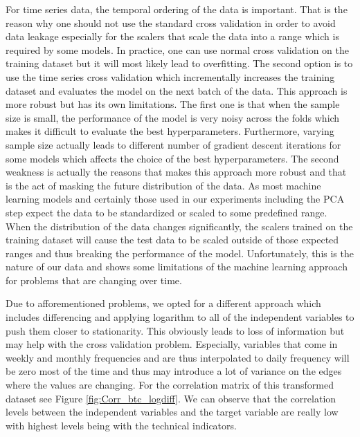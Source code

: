 For time series data, the temporal ordering of the data is important.
That is the reason why one should not use the standard cross validation
in order to avoid data leakage especially 
for the scalers that scale the data into a range
which is required by some models. In practice, 
one can use normal cross validation on the training dataset
but it will most likely lead to overfitting.
The second option is to use the time series cross validation
which incrementally increases the training dataset 
and evaluates the model on the next batch of the data.
This approach is more robust but has its own limitations.
The first one is that when the sample size is small, 
the performance of the model is very noisy across the folds
which makes it difficult to evaluate the best hyperparameters. 
Furthermore, varying sample size actually 
leads to different number of gradient descent iterations
for some models which affects the choice of the best hyperparameters.
The second weakness is actually the reasons
that makes this approach more robust and that is the
act of masking the future distribution of the data.
As most machine learning models and certainly 
those used in our experiments including the \ac{PCA} step
expect the data to be standardized
or scaled to some predefined range.
When the distribution of the data changes
significantly, the scalers trained on the training dataset
will cause the test data to be scaled
outside of those expected ranges and thus breaking the 
performance of the model. 
Unfortunately,
this is the nature of our data 
and shows some limitations of the machine learning approach 
for problems that are changing over time.


Due to afforementioned problems, we opted for a different approach
which includes differencing and applying logarithm to all of
the independent variables to push them closer to stationarity.
This obviously leads to loss of information 
but may help with the cross validation problem.
Especially, variables that come in weekly and monthly frequencies
and are thus interpolated to daily frequency
will be zero most of the time and thus
may introduce a lot of variance on the edges where the values
are changing. For the correlation matrix of this transformed 
dataset see Figure \ref{fig:Corr_btc_logdiff}. We can 
observe that the correlation levels between the independent variables
and the target variable are really low with highest 
levels being with the technical indicators.

